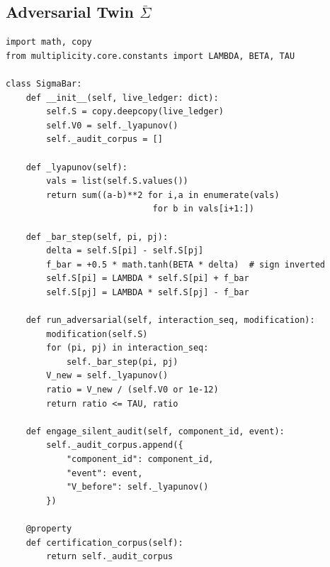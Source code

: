 \documentclass[12pt,letterpaper]{article}
\begin{document}
\subsection{Adversarial Twin $\bar\Sigma$}
\begin{lstlisting}[caption={mirror\_dissonance/sigma\_bar.py}]
import math, copy
from multiplicity.core.constants import LAMBDA, BETA, TAU

class SigmaBar:
    def __init__(self, live_ledger: dict):
        self.S = copy.deepcopy(live_ledger)
        self.V0 = self._lyapunov()
        self._audit_corpus = []

    def _lyapunov(self):
        vals = list(self.S.values())
        return sum((a-b)**2 for i,a in enumerate(vals)
                             for b in vals[i+1:])

    def _bar_step(self, pi, pj):
        delta = self.S[pi] - self.S[pj]
        f_bar = +0.5 * math.tanh(BETA * delta)  # sign inverted
        self.S[pi] = LAMBDA * self.S[pi] + f_bar
        self.S[pj] = LAMBDA * self.S[pj] - f_bar

    def run_adversarial(self, interaction_seq, modification):
        modification(self.S)
        for (pi, pj) in interaction_seq:
            self._bar_step(pi, pj)
        V_new = self._lyapunov()
        ratio = V_new / (self.V0 or 1e-12)
        return ratio <= TAU, ratio

    def engage_silent_audit(self, component_id, event):
        self._audit_corpus.append({
            "component_id": component_id,
            "event": event,
            "V_before": self._lyapunov()
        })

    @property
    def certification_corpus(self):
        return self._audit_corpus
\end{lstlisting}
\end{document}
